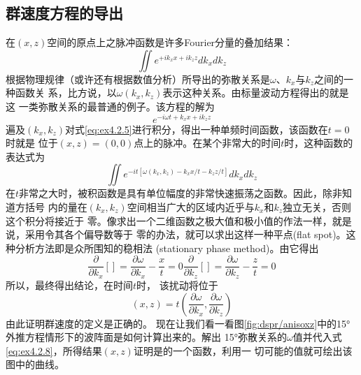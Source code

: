\subsection{群速度方程的导出}
\label{sec:4.2.4}
在$(x,z)$空间的原点上之脉冲函数是许多Fourier分量的叠加结果：
\begin{equation}
\iint e^{+ik_xx+ik_zz}dk_xdk_z
\label{eq:ex4.2.4}
\end{equation}
根据物理规律（或许还有根据数值分析）所导出的弥散关系是$\omega$、$k_x$与$k_z$之间的一种函数关
系，比方说，以$\omega(k_x,k_z)$表示这种关系。由标量波动方程得出的就是这
一类弥散关系的最普通的例子。该方程的解为
\begin{equation}
e^{-i\omega t+ k_xx+ik_zz}
\label{eq:ex4.2.5}
\end{equation}
遍及$(k_x,k_z)$对式\ref{eq:ex4.2.5}进行积分，得出一种单频时间函数，该函数在$t=0$时就是
位于$(x,z)=(0,0)$点上的脉冲。在某个非常大的时间$t$时，这种函数的表达式为
\begin{equation}
\iint e^{-it[\omega(k_x,k_z)-k_xx/t-k_zz/t]}dk_xdk_z
\label{eq:ex4.2.6}
\end{equation}
在$t$非常之大时，被积函数是具有单位幅度的非常快速振荡之函数。因此，除非知道方括号
内的量在$(k_x,k_z)$空间相当广大的区域内近乎与$k_x$和$k_z$独立无关，否则这个积分将接近于
零。像求出一个二维函数之极大值和极小值的作法一样，就是说，采用令其各个偏导数等于
零的办法，就可以求出这样一种平点(flat spot)。这种分析方法即是众所围知的稳相法
(stationary phase method)。由它得出
\begin{subequations}
\begin{equation}
\frac{\partial}{\partial k_x}[]=\frac{\partial\omega}{\partial k_x}-\frac{x}{t}=0
\label{eq:ex4.2.7a}
\end{equation}
\begin{equation}
\frac{\partial}{\partial k_z}[]=\frac{\partial\omega}{\partial k_z}-\frac{z}{t}=0
\label{eq:ex4.2.7b}
\end{equation}
\label{eq:ex4.2.7}
\end{subequations}
所以，最终得出结论，在时间$t$时， 该扰动将位于
\begin{equation}
(x,z)=t(\frac{\partial\omega}{\partial k_x},\frac{\partial\omega}{\partial k_z})
\label{eq:ex4.2.8}
\end{equation}
由此证明群速度的定义是正确的。
现在让我们看一看图\ref{fig:dspr/anisoxz}中的15°外推方程情形下的波阵面是如何计算出来的。解出
15°弥散关系的$\omega$值并代入式\ref{eq:ex4.2.8}，所得结果$(x,z)$证明是的一个函数，利用一
切可能的值就可绘出该图中的曲线。

